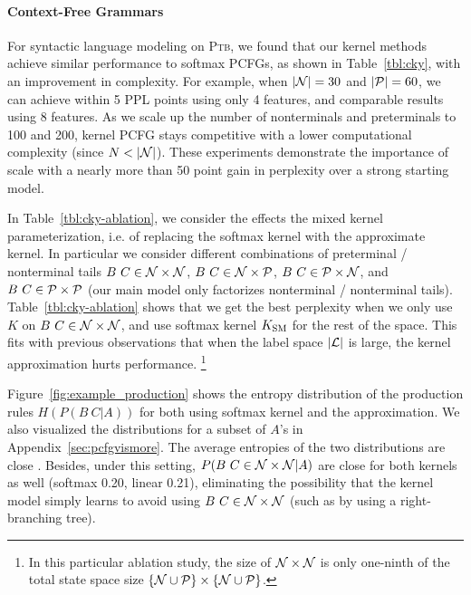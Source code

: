 \documentclass{article}
\begin{document}
\paragraph{Context-Free Grammars}

For syntactic language modeling on \textsc{Ptb}, we found that our kernel methods achieve similar performance to softmax PCFGs, as shown in Table~\ref{tbl:cky}, with an improvement in complexity. For example, when $|\mathcal{N}|=30$ and $|\mathcal{P}|=60$, we can achieve within 5 PPL points using only 4 features, and comparable results using 8 features. As we scale up the number of nonterminals and preterminals to 100 and 200, kernel PCFG stays competitive with a lower computational complexity (since $N < |\mathcal{N}|$). These experiments demonstrate the importance of scale with a nearly more than 50 point gain in perplexity over a strong starting model. 

In Table~\ref{tbl:cky-ablation}, we consider the effects the mixed kernel parameterization, i.e. of replacing the softmax kernel with the approximate kernel. In particular we consider different combinations of preterminal / nonterminal tails $B\ C\in \mathcal{N}\times\mathcal{N}$, $B\ C\in \mathcal{N}\times\mathcal{P}$, $B\ C\in \mathcal{P}\times\mathcal{N}$, and $B\ C\in \mathcal{P}\times\mathcal{P}$ (our main model only factorizes nonterminal / nonterminal tails). Table~\ref{tbl:cky-ablation} shows that we get the best perplexity when we only use $K$ on $B\ C\in \mathcal{N}\times\mathcal{N}$, and use softmax kernel $K_{\mathrm{SM}}$ for the rest of the space. This fits with previous observations that when the label space $|\mathcal{L}|$ is large, the kernel approximation hurts performance. \footnote{In this particular ablation study, the size of $\mathcal{N}\times\mathcal{N}$ is only one-ninth of the total state space size $\{\mathcal{N} \cup \mathcal{P}\}\times \{\mathcal{N} \cup \mathcal{P}\}$.}


Figure~\ref{fig:example_production} shows the entropy distribution of the production rules $H(P(B\ C | A))$ for both using softmax kernel and the approximation. We also visualized the distributions for a subset of $A$'s in Appendix~\ref{sec:pcfgvismore}. The average entropies of the two distributions are close . Besides, under this setting, $P(B\ C \in \mathcal{N} \times \mathcal{N}| A)$ are close for both kernels as well (softmax 0.20, linear 0.21), eliminating the possibility that the kernel model simply learns to avoid using $B\ C \in \mathcal{N} \times \mathcal{N}$ (such as by using a right-branching tree). 
\end{document}
